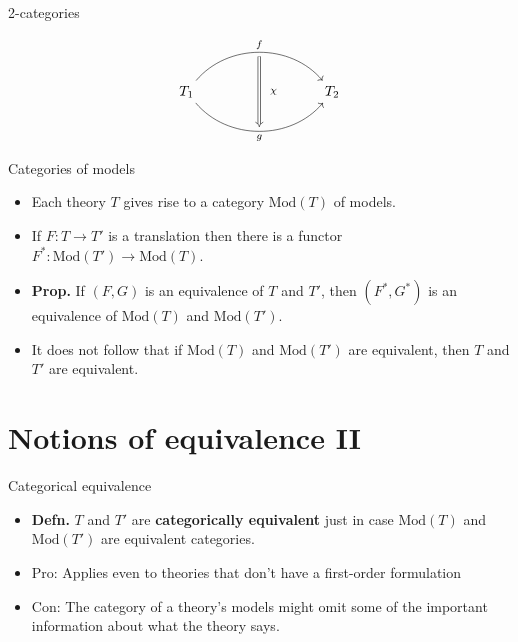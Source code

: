 \documentclass[fleqn]{beamer}
\begin{document}
\begin{frame}[fragile]{2-categories}

\[
\begin{tikzcd}[column sep=3cm]
  T_1 \arrow[r, bend left=50, "f"{name=U}] 
      \arrow[r, bend right=50, "g"{name=D, swap}] & T_2
  \arrow[
    Rightarrow, 
    from=U, to=D, 
    shorten <=3pt, shorten >=3pt,
    "\chi"'{pos=0.5, xshift=15pt}
  ]
\end{tikzcd}
\]  

\end{frame}

\begin{frame}{Categories of models}

  \begin{itemize}
  \item Each theory $T$ gives rise to a category $\mathrm{Mod}(T)$ of
    models.
  \item If $F:T\to T'$ is a translation then there is a functor
    $F^*:\mathrm{Mod}(T')\to \mathrm{Mod}(T)$.
  \item \textbf{Prop.} If $(F,G)$ is an equivalence of $T$ and $T'$,
    then $(F^*,G^*)$ is an equivalence of $\mathrm{Mod}(T)$ and
    $\mathrm{Mod}(T')$.
  \item It does not follow that if $\mathrm{Mod}(T)$ and
    $\mathrm{Mod}(T')$ are equivalent, then $T$ and $T'$ are
    equivalent.
  \end{itemize}

\end{frame}


\section{Notions of equivalence II}


\begin{frame}{Categorical equivalence}

  \begin{itemize}
  \item \textbf{Defn.} $T$ and $T'$ are \textbf{categorically
      equivalent} just in case $\mathrm{Mod}(T)$ and
    $\mathrm{Mod}(T')$ are equivalent categories.
  \item Pro: Applies even to theories that don't have a first-order
    formulation
  \item Con: The category of a theory's models might omit some of the
    important information about what the theory says.
  \end{itemize}  

\end{frame}
\end{document}

